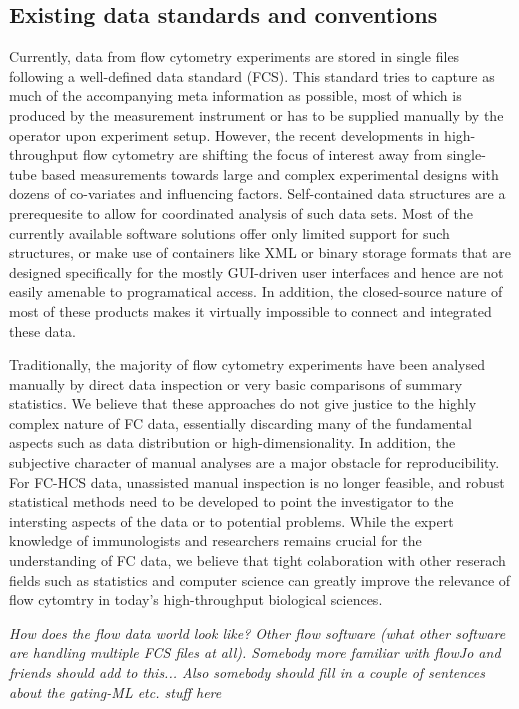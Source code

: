 \documentclass[12pt]{article}
\begin{document}
\subsection{Existing data standards and conventions}
Currently, data from flow cytometry experiments are stored in single
files following a well-defined data standard (FCS). This standard
tries to capture as much of the accompanying meta information as
possible, most of which is produced by the measurement instrument or
has to be supplied manually by the operator upon experiment
setup. However, the recent developments in high-throughput flow
cytometry are shifting the focus of interest away from single-tube
based measurements towards large and complex experimental designs with
dozens of co-variates and influencing factors. Self-contained data
structures are a prerequesite to allow for coordinated analysis of
such data sets. Most of the currently available software solutions
offer only limited support for such structures, or make use of
containers like XML or binary storage formats that are designed
specifically for the mostly GUI-driven user interfaces and hence are
not easily amenable to programatical access. In addition, the
closed-source nature of most of these products makes it virtually
impossible to connect and integrated these data. 

Traditionally, the majority of flow cytometry experiments have been
analysed manually by direct data inspection or very basic comparisons
of summary statistics. We believe that these approaches do not give
justice to the highly complex nature of FC data, essentially
discarding many of the fundamental aspects such as data distribution
or high-dimensionality. In addition, the subjective character of
manual analyses are a major obstacle for reproducibility. For FC-HCS
data, unassisted manual inspection is no longer feasible, and robust
statistical methods need to be developed to point the investigator to
the intersting aspects of the data or to potential problems. While the
expert knowledge of immunologists and researchers remains crucial for
the understanding of FC data, we believe that tight colaboration
with other reserach fields such as statistics and computer science can
greatly improve the relevance of flow cytomtry in today's
high-throughput biological sciences.


\textit{How does the flow data world look like? Other flow software
  (what other software are handling multiple FCS files at
  all). Somebody more familiar with flowJo and friends should add to
  this... Also somebody should fill in a couple of sentences about the
  gating-ML etc. stuff here}
\end{document}
